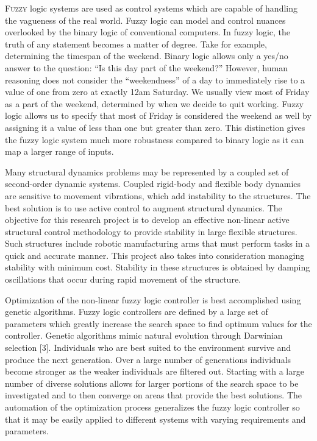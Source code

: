 \documentclass[draft]{aiaa-tc}%
\begin{document}
\lettrine[nindent=0pt]{F}{uzzy} logic systems are used as control systems which are capable of handling the vagueness of the real world. Fuzzy logic can model and control nuances overlooked by the binary logic of conventional computers.\cite{kosko:91bk} In fuzzy logic, the truth of any statement becomes a matter of degree. Take for example, determining the timespan of the weekend.\cite{matlab:12tb} Binary logic allows only a yes/no answer to the question: ``Is this day part of the weekend?'' However, human reasoning does not consider the ``weekendness'' of a day to immediately rise to a value of one from zero at exactly 12am Saturday. We usually view most of Friday as a part of the weekend, determined by when we decide to quit working. Fuzzy logic allows us to specify that most of Friday is considered the weekend as well by assigning it a value of less than one but greater than zero. This distinction gives the fuzzy logic system much more robustness compared to binary logic as it can map a larger range of inputs.

Many structural dynamics problems may be represented by a coupled set of second-order dynamic systems. Coupled rigid-body and flexible body dynamics are sensitive to movement vibrations, which add instability to the structures. The best solution is to use active control to augment structural dynamics.
The objective for this research project is to develop an effective non-linear active structural control methodology to provide stability in large flexible structures. Such structures include robotic manufacturing arms that must perform tasks in a quick and accurate manner. This project also takes into consideration managing stability with minimum cost. Stability in these structures is obtained by damping oscillations that occur during rapid movement of the structure.

Optimization of the non-linear fuzzy logic controller is best accomplished using genetic algorithms. Fuzzy logic controllers are defined by a large set of parameters which greatly increase the search space to find optimum values for the controller. Genetic algorithms mimic natural evolution through Darwinian selection [3]. Individuals who are best suited to the environment survive and produce the next generation. Over a large number of generations individuals become stronger as the weaker individuals are filtered out. Starting with a large number of diverse solutions allows for larger portions of the search space to be investigated and to then converge on areas that provide the best solutions. The automation of the optimization process generalizes the fuzzy logic controller so that it may be easily applied to different systems with varying requirements and parameters.
 
\end{document}
